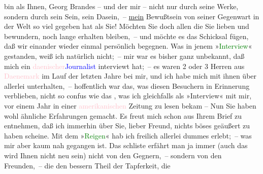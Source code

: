                bin als Ihnen, Georg Brandes – und der mir – nicht nur durch seine Werke, sondern
               durch sein Sein, sein Dasein, – \uline{mein} Bewußtsein von
               seiner Gegenwart {\pb}in der Welt so viel gegeben hat
               als Sie! Möchten Sie doch allen die Sie lieben und bewundern, noch lange erhalten
               bleiben, – und möchte es das Schicksal fügen, daß wir einander wieder einmal
               persönlich begegnen.\pend
           \pstart
           Was in jenem »\textcolor{green}{Interview}{}«
               gestanden, weiß ich natürlich nicht; – mir war es bisher ganz unbekannt, daß mich ein
                  \textcolor{pink}{daenischer}{}\ledrightnote{\textcolor{pink}{Dänemark}}{ }\textcolor{blue}{Journalist}{} interviewt hat; – es
               waren 2 oder 3 Herren aus \textcolor{pink}{Daenemark}{}\ledrightnote{\textcolor{pink}{Dänemark}} im Lauf der
               letzten Jahre bei mir, und ich habe \introOben{}mich\introOben{} mit ihnen \introOben{}über allerlei\introOben{} unterhalten, – hoffentlich war das, was diesen
               Besuchern in Erinnerung verblieben, nicht so confus wie das \label{K_L02376_1v}\label{K_L02376_1h}, was ich
               gleichfalls als »Interview« mit mir, vor einem Jahr in einer \textcolor{pink}{amerikanischen}{}\ledrightnote{\textcolor{pink}{Amerika}} Zeitung zu lesen bekam – Nun Sie haben wohl
               ähnliche Erfahrungen gemacht. Es freut mich schon aus Ihrem Brief zu entnehmen, daß
               ich immerhin über {\pb}Sie, lieber Freund, nichts
               böses geäußert zu haben scheine.\pend
           \pstart
           Mit dem »\textcolor{green}{Reigen}{}\ledrightnote{\textcolor{green}{Reigen. Zehn Dialoge}}« hab ich freilich allerlei dummes
               erlebt; – was mir aber kaum nah gegangen ist. Das schli{\geminationm}ste erfährt man ja immer (auch das wird Ihnen nicht neu sein) nicht von den
               Gegnern, – sondern von den Freunden, – die den bessern Theil der Tapferkeit, die
